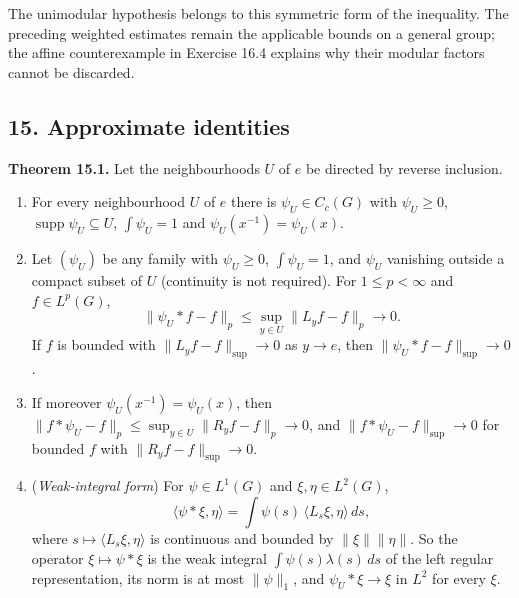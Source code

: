 \documentclass[
  english,
  11pt,
  a4paper,
]{article}
\providecommand{\tightlist}{%
  \setlength{\itemsep}{0pt}\setlength{\parskip}{0pt}}
\begin{document}
The unimodular hypothesis belongs to this symmetric form of the
inequality. The preceding weighted estimates remain the applicable
bounds on a general group; the affine counterexample in Exercise 16.4
explains why their modular factors cannot be discarded.

\subsection[15. Approximate
identities]{\texorpdfstring{\protect\hypertarget{haar-measure-on-locally-compact-groups--oa-fnd-hm-13}{}{}15.
Approximate
identities}{15. Approximate identities}}\label{haar-measure-on-locally-compact-groups--OA-FND-HM-13}

\textbf{Theorem 15.1.} Let the neighbourhoods \(U\) of \(e\) be directed
by reverse inclusion.

\begin{enumerate}
\tightlist
\item
  For every neighbourhood \(U\) of \(e\) there is \(\psi_U\in C_c(G)\)
  with \(\psi_U\geq0\), \(\operatorname{supp}\psi_U\subseteq U\),
  \(\int\psi_U=1\) and \(\psi_U(x^{-1})=\psi_U(x)\).
\item
  Let \((\psi_U)\) be any family with \(\psi_U\geq0\), \(\int\psi_U=1\),
  and \(\psi_U\) vanishing outside a compact subset of \(U\) (continuity
  is not required). For \(1\leq p<\infty\) and \(f\in L^p(G)\),
  \[\|\psi_U*f-f\|_p\leq\sup_{y\in U}\|L_yf-f\|_p\longrightarrow0 .
  \tag{15.1}\] If \(f\) is bounded with \(\|L_yf-f\|_{\sup}\to0\) as
  \(y\to e\), then \(\|\psi_U*f-f\|_{\sup}\to0\).
\item
  If moreover \(\psi_U(x^{-1})=\psi_U(x)\), then
  \(\|f*\psi_U-f\|_p\leq\sup_{y\in U}\|R_yf-f\|_p\to0\), and
  \(\|f*\psi_U-f\|_{\sup}\to0\) for bounded \(f\) with
  \(\|R_yf-f\|_{\sup}\to0\).
\item
  (\emph{Weak-integral form}) For \(\psi\in L^1(G)\) and
  \(\xi,\eta\in L^2(G)\),
  \[\langle\psi*\xi,\eta\rangle=\int\psi(s)\,\langle L_s\xi,\eta\rangle\,ds ,
  \tag{15.2}\] where \(s\mapsto\langle L_s\xi,\eta\rangle\) is
  continuous and bounded by \(\|\xi\|\|\eta\|\). So the operator
  \(\xi\mapsto\psi*\xi\) is the weak integral
  \(\int\psi(s)\lambda(s)\,ds\) of the left regular representation, its
  norm is at most \(\|\psi\|_1\), and \(\psi_U*\xi\to\xi\) in \(L^2\)
  for every \(\xi\).
\end{enumerate}
\end{document}

